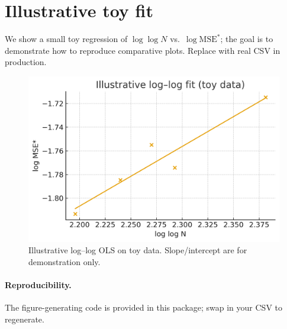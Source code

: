 \documentclass[11pt]{article}
\begin{document}
\section{Illustrative toy fit}
We show a small toy regression of $\log\log N$ vs.\ $\log \mathrm{MSE}^\ast$; the goal is to demonstrate how to reproduce comparative plots. Replace with real CSV in production.
\begin{figure}[h]
\centering
\includegraphics[width=0.75\linewidth]{figures/abf_regression.png}
\caption{Illustrative log--log OLS on toy data. Slope/intercept are for demonstration only.}
\end{figure}

\paragraph{Reproducibility.} The figure-generating code is provided in this package; swap in your CSV to regenerate.
\end{document}
